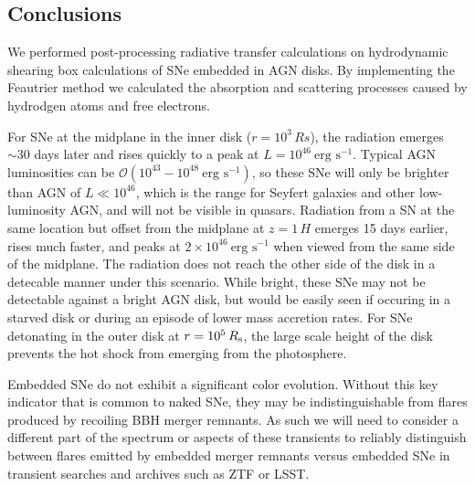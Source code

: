 

\subsection{Conclusions} \label{sec:conclusion}

We performed post-processing radiative transfer calculations on hydrodynamic shearing box calculations of SNe embedded in AGN disks.
By implementing the Feautrier method we calculated the absorption and scattering processes caused by hydrodgen atoms and free electrons.

For SNe at the midplane in the inner disk ($r=10^3\,Rs$), the radiation emerges $\sim30$ days later and rises quickly to a peak at $L=10^{46}\ \text{erg s}^{-1}$.
Typical AGN luminosities can be $\mathcal{O}(10^{43}-10^{48}\ \text{erg s}^{-1})$, so these SNe will only be brighter than AGN of $L\ll10^{46}$, which is the range for Seyfert galaxies and other low-luminosity AGN, and will not be visible in quasars.
Radiation from a SN at the same location but offset from the midplane at $z=1\,H$ emerges 15 days earlier, rises much faster, and peaks at $2 \times 10^{46}\ \text{erg s}^{-1}$ when viewed from the same side of the midplane.
The radiation does not reach the other side of the disk in a detecable manner under this scenario.
While bright, these SNe may not be detectable against a bright AGN disk, but would be easily seen if occuring in a starved disk or during an episode of lower mass accretion rates.
For SNe detonating in the outer disk at $r=10^5\,R_{\rm s}$, the large scale height of the disk prevents the hot shock from emerging from the photosphere.

Embedded SNe do not exhibit a significant color evolution.
Without this key indicator that is common to naked SNe, they may be indistinguishable from flares produced by recoiling BBH merger remnants.
As such we will need to consider a different part of the spectrum or aspects of these transients to reliably distinguish between flares emitted by embedded merger remnants versus embedded SNe in transient searches and archives such as ZTF or LSST.

